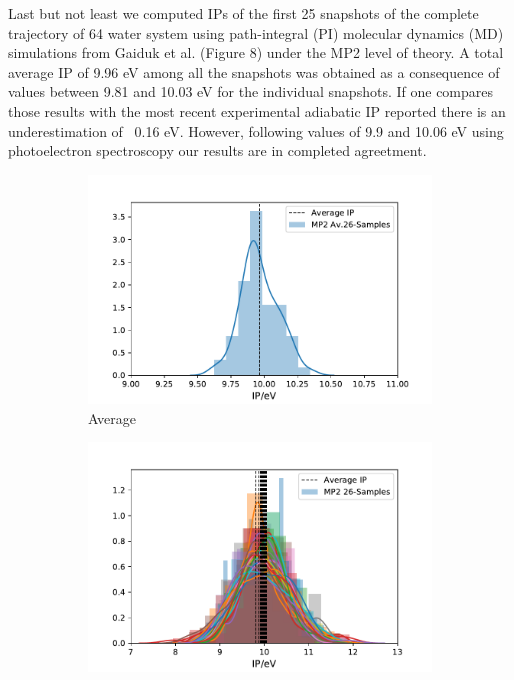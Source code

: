 \documentclass[12pt,a4paper]{article}
\begin{document}
Last but not least we computed IPs of the first 25 snapshots of the complete trajectory of 64 water system using path-integral (PI) molecular
dynamics (MD) simulations from Gaiduk et al. \cite{gaiduk2018electron} (Figure 8) under the MP2 level of theory.
A total average IP of 9.96 eV among all the snapshots was obtained as a consequence of values between 9.81 and 10.03 eV
for the individual snapshots. If one compares those results with the most recent experimental adiabatic IP reported 
\cite{perry2020ionization} there is an underestimation of ~0.16 eV. 
However, following values of 9.9 \cite{winter2004full}and 10.06 eV \cite{kurahashi2014photoelectron} using photoelectron spectroscopy
our results are in completed agreetment.

\begin{figure}[!ht]
        \captionsetup[subfigure]{labelformat=empty}
        \centering
        \begin{subfigure}{0.4\linewidth}
                \includegraphics[width=\linewidth]{images/average30}
                \caption{Average}
        \end{subfigure}
        \begin{subfigure}{0.4\linewidth}
                \includegraphics[width=\linewidth]{images/total30}

\end{subfigure}
\end{figure}
\end{document}
